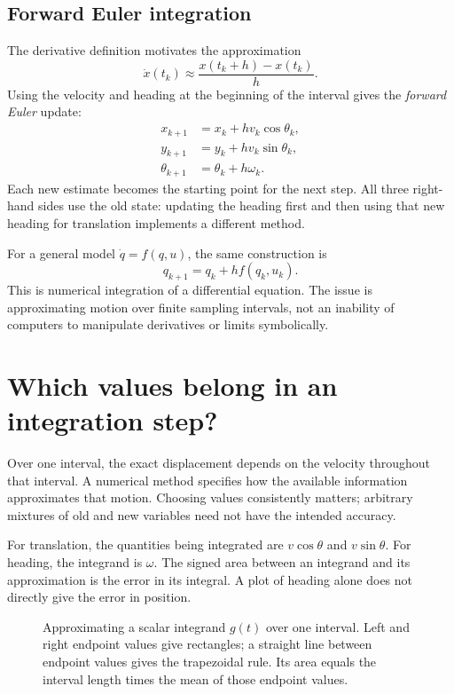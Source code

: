 \subsection{Forward Euler integration}
The derivative definition motivates the approximation
\[
 \dot x(t_k)\approx\frac{x(t_k+h)-x(t_k)}h.
\]
Using the velocity and heading at the beginning of the interval gives the
\emph{forward Euler} update:
\begin{equation}
 \boxed{\begin{aligned}
 x_{k+1}&=x_k+h v_k\cos\theta_k,\\
 y_{k+1}&=y_k+h v_k\sin\theta_k,\\
 \theta_{k+1}&=\theta_k+h\omega_k.
 \end{aligned}}
 \label{eq:l09-euler}
\end{equation}
Each new estimate becomes the starting point for the next step. All three
right-hand sides use the old state: updating the heading first and then
using that new heading for translation implements a different method.

For a general model $\dot q=f(q,u)$, the same construction is
\begin{equation}
 q_{k+1}=q_k+h f(q_k,u_k).
\end{equation}
This is numerical integration of a differential equation. The issue is
approximating motion over finite sampling intervals, not an inability of
computers to manipulate derivatives or limits symbolically.

\section{Which values belong in an integration step?}
Over one interval, the exact displacement depends on the velocity throughout
that interval. A numerical method specifies how the available information
approximates that motion. Choosing values consistently matters; arbitrary
mixtures of old and new variables need not have the intended accuracy.

For translation, the quantities being integrated are $v\cos\theta$ and
$v\sin\theta$. For heading, the integrand is $\omega$. The signed area
between an integrand and its approximation is the error in its integral.
A plot of heading alone does not directly give the error in position.

\begin{figure}[htbp]
\centering
\caption{Approximating a scalar integrand $g(t)$ over one interval. Left
and right endpoint values give rectangles; a straight line between endpoint
values gives the trapezoidal rule. Its area equals the interval length times
the mean of those endpoint values.}
\label{fig:l09-quadrature}
\end{figure}

